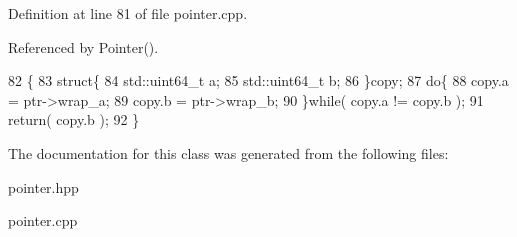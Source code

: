 Definition at line 81 of file pointer.\+cpp.



Referenced by Pointer().


\begin{DoxyCode}
82 \{
83    \textcolor{keyword}{struct}\{
84       std::uint64\_t a;
85       std::uint64\_t b;
86    \}copy;
87    \textcolor{keywordflow}{do}\{
88       copy.a = ptr->wrap\_a;
89       copy.b = ptr->wrap\_b;
90    \}\textcolor{keywordflow}{while}( copy.a != copy.b );
91    \textcolor{keywordflow}{return}( copy.b );
92 \}
\end{DoxyCode}


The documentation for this class was generated from the following files\+:\begin{DoxyCompactItemize}
\item 
pointer.\+hpp\item 
pointer.\+cpp\end{DoxyCompactItemize}
